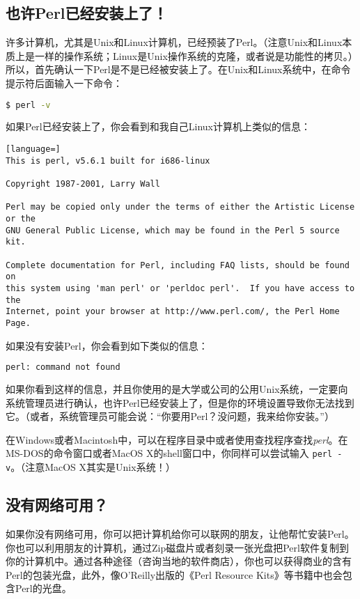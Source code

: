 \subsection{也许Perl已经安装上了！}
许多计算机，尤其是Unix和Linux计算机，已经预装了Perl。（注意Unix和Linux本质上是一样的操作系统；Linux是Unix操作系统的克隆，或者说是功能性的拷贝。）所以，首先确认一下Perl是不是已经被安装上了。在Unix和Linux系统中，在命令提示符后面输入一下命令：

\begin{lstlisting}[language=bash]
$ perl -v
\end{lstlisting}

如果Perl已经安装上了，你会看到和我自己Linux计算机上类似的信息：

\begin{lstlisting}[language=]
This is perl, v5.6.1 built for i686-linux

Copyright 1987-2001, Larry Wall

Perl may be copied only under the terms of either the Artistic License or the
GNU General Public License, which may be found in the Perl 5 source kit.

Complete documentation for Perl, including FAQ lists, should be found on
this system using 'man perl' or 'perldoc perl'.  If you have access to the
Internet, point your browser at http://www.perl.com/, the Perl Home Page.
\end{lstlisting}

如果没有安装Perl，你会看到如下类似的信息：

\begin{lstlisting}[language=sh]
perl: command not found
\end{lstlisting}

如果你看到这样的信息，并且你使用的是大学或公司的公用Unix系统，一定要向系统管理员进行确认，也许Perl已经安装上了，但是你的环境设置导致你无法找到它。（或者，系统管理员可能会说：“你要用Perl？没问题，我来给你安装。”）

在Windows或者Macintosh中，可以在程序目录中或者使用查找程序查找\textit{perl}。在MS-DOS的命令窗口或者MacOS X的shell窗口中，你同样可以尝试输入 \verb|perl -v|。（注意MacOS X其实是Unix系统！）

\subsection{没有网络可用？}
如果你没有网络可用，你可以把计算机给你可以联网的朋友，让他帮忙安装Perl。你也可以利用朋友的计算机，通过Zip磁盘片或者刻录一张光盘把Perl软件复制到你的计算机中。通过各种途径（咨询当地的软件商店），你也可以获得商业的含有Perl的包装光盘，此外，像O'Reilly出版的《Perl Resource Kits》等书籍中也会包含Perl的光盘。

